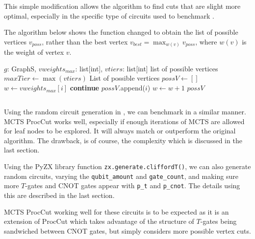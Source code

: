 \documentclass[11pt]{article} %
\theoremstyle{definition}
\begin{document}
This simple modification allows the algorithm to find cuts that are slight more optimal,
especially in the specific type of circuits used to benchmark \cite{sutcliffe2024procedurally}.

The algorithm below shows the function changed to obtain the list of possible vertices $v_{poss}$,
rather than the best vertex $v_{best} = \max_{w(v)} v_{poss}$, where $w(v)$ is the weight of vertex $v$.

\begin{algorithm}[H]
\caption{bestCut}
\label{alg:bestCutM}
\begin{algorithmic}[1]
\Require $g$: GraphS, $vweights_{max}$: list[int], $vtiers$: list[int]
\Ensure list of possible vertices
\State $maxTier \gets \max(vtiers)$
\State List of possible vertices $possV \gets []$
    \State $w \gets vweights_{max}[i]$
        \State \textbf{continue}
    \EndIf
    \State $possV$.append($i$)
        \State $w \gets w + 1$ 
    \EndIf
\EndFor
\State \Return $possV$
\end{algorithmic}
\end{algorithm}


\subsection{}
Using the random circuit generation in \cite{sutcliffe2024procedurally},
we can benchmark in a similar manner.
MCTS ProcCut works well, especially if enough iterations of MCTS are allowed for leaf nodes to be explored.
It will always match or outperform the original algorithm.
The drawback, is of course, the complexity which is discussed in the last section.

Using the PyZX library \cite{kissinger2020Pyzx} function \texttt{zx.generate.cliffordT()}, 
we can also generate random circuits, varying the \texttt{qubit\_amount} and \texttt{gate\_count},
and making sure more $T$-gates and CNOT gates appear with 
\texttt{p\_t} and \texttt{p\_cnot}.
The details using this are described in the last section.

MCTS ProcCut working well for these circuits is to be expected 
as it is an extension of ProcCut \cite{sutcliffe2024procedurally} 
which takes advantage of the structure of $T$-gates being sandwiched between CNOT gates,
but simply considers more possible vertex cuts.
\end{document}
